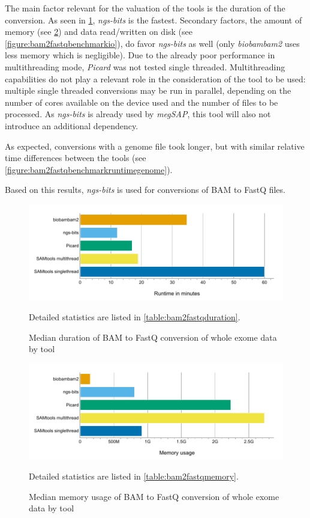 The main factor relevant for the valuation of the tools is the duration of the conversion. As seen in \cref{figure:bam2fastqbenchmarkruntime}, \textit{ngs-bits} is the fastest. Secondary factors, the amount of memory (see \cref{figure:bam2fastqbenchmarkmemory}) and data read/written on disk (see \cref{figure:bam2fastqbenchmarkio}), do favor \textit{ngs-bits} as well (only \textit{biobambam2} uses less memory which is negligible). Due to the already poor performance in multithreading mode, \textit{Picard} was not tested single threaded. Multithreading capabilities do not play a relevant role in the consideration of the tool to be used: multiple single threaded conversions may be run in parallel, depending on the number of cores available on the device used and the number of files to be processed. As \textit{ngs-bits} is already used by \textit{\ac{megSAP}}, this tool will also not introduce an additional dependency.

As expected, conversions with a genome file took longer, but with similar relative time differences between the tools (see \cref{figure:bam2fastqbenchmarkruntimegenome}).

Based on this results, \textit{ngs-bits} is used for conversions of BAM to FastQ files.

\begin{figure}[H]
    \centering
	\includegraphics[width=\linewidth,height=\textheight,keepaspectratio]{bam2fastqbenchmark_runtime}
	\caption[Median duration of BAM to FastQ conversion of whole exome data by tool]{Median duration of BAM to FastQ conversion of whole exome data by tool}{Detailed statistics are listed in \cref{table:bam2fastqduration}.}
	\label{figure:bam2fastqbenchmarkruntime}
\end{figure}

\begin{figure}[H]
    \centering
	\includegraphics[width=\linewidth,height=\textheight,keepaspectratio]{bam2fastqbenchmark_memory}
	\caption[Median memory usage of BAM to FastQ conversion of whole exome data by tool]{Median memory usage of BAM to FastQ conversion of whole exome data by tool}{Detailed statistics are listed in \cref{table:bam2fastqmemory}.}
	\label{figure:bam2fastqbenchmarkmemory}
\end{figure}

